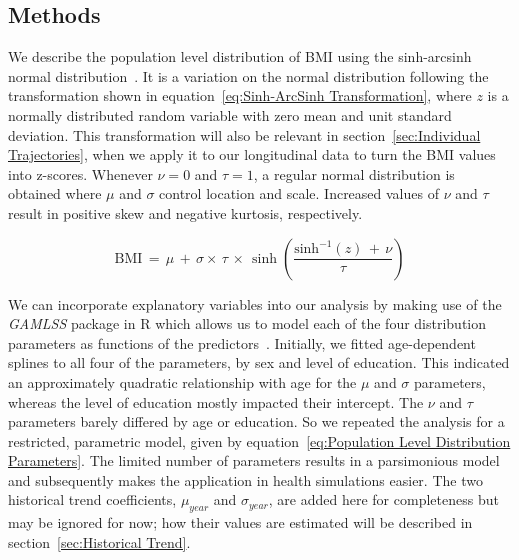 \documentclass{imammb}
\numberwithin{equation}{section}
\begin{document}
\subsection{Methods}
\label{sec:Population Level Distribution/Methods}

We describe the population level distribution of BMI using the sinh-arcsinh normal distribution~\citep{Jones2009, Jones2019}. It is a variation on the normal distribution following the transformation shown in equation~\ref{eq:Sinh-ArcSinh Transformation}, where $z$ is a normally distributed random variable with zero mean and unit standard deviation. This transformation will also be relevant in section~\ref{sec:Individual Trajectories}, when we apply it to our longitudinal data to turn the BMI values into z-scores. Whenever $\nu = 0$ and $\tau =  1$, a regular normal distribution is obtained where $\mu$ and $\sigma$ control location and scale. Increased values of $\nu$ and $\tau$ result in positive skew and negative kurtosis, respectively.

\vspace{-1mm}

\begin{equation}
\label{eq:Sinh-ArcSinh Transformation}
\text{BMI} \, = \, \mu \, + \, \sigma \times \, \tau \, \times \, \sinh \left(\frac{\text{sinh}^{-1}(z) \, + \, \nu}{\tau}\right)
\end{equation}

\vspace{1mm}

We can incorporate explanatory variables into our analysis by making use of the \textit{GAMLSS} package in R which allows us to model each of the four distribution parameters as functions of the predictors~\citep{Rigby2005, Stasinopoulos2007, R2021}. Initially, we fitted age-dependent splines to all four of the parameters, by sex and level of education. This indicated an approximately quadratic relationship with age for the $\mu$ and $\sigma$ parameters, whereas the level of education mostly impacted their intercept. The $\nu$ and $\tau$ parameters barely differed by age or education. So we repeated the analysis for a restricted, parametric model, given by equation~\ref{eq:Population Level Distribution Parameters}. The limited number of parameters results in a parsimonious model and subsequently makes the application in health simulations easier. The two historical trend coefficients, $\mu_{year}$ and $\sigma_{year}$, are added here for completeness but may be ignored for now; how their values are estimated will be described in section~\ref{sec:Historical Trend}.
\end{document}
